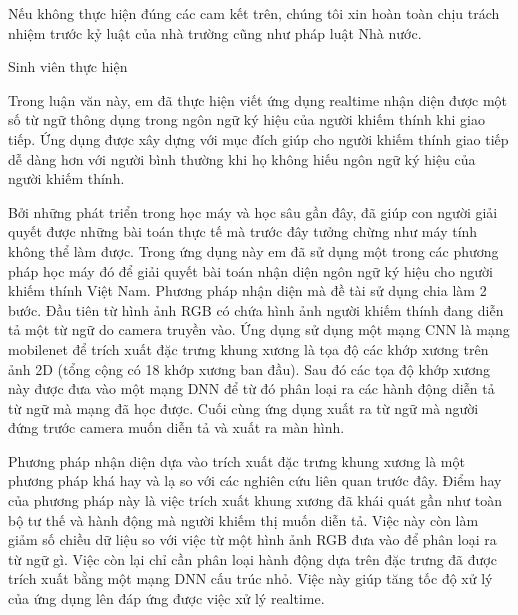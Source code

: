 Nếu không thực hiện đúng các cam kết trên, chúng tôi xin hoàn toàn chịu trách nhiệm trước kỷ luật của nhà trường cũng như pháp luật Nhà nước.

\begin{flushright}
Sinh viên thực hiện
\end{flushright}


\newpage
{}
\thispagestyle{tom_tat}
\begin{center}
{}
\end{center}

Trong luận văn này, em đã thực hiện viết ứng dụng realtime nhận diện được một số từ ngữ thông dụng trong ngôn ngữ ký hiệu của người khiếm thính khi giao tiếp. Ứng dụng được xây dựng với mục đích giúp cho người khiếm thính giao tiếp dễ dàng hơn với người bình thường khi họ không hiếu ngôn ngữ ký hiệu của người khiếm thính.

Bởi những phát triển trong học máy và học sâu gần đây, đã giúp con người giải quyết được những bài toán thực tế mà trước đây tưởng chừng như máy tính không thể làm được. Trong ứng dụng này em đã sử dụng một trong các phương pháp học máy đó để giải quyết bài toán nhận diện ngôn ngữ ký hiệu cho người khiếm thính Việt Nam. Phương pháp nhận diện mà đề tài sử dụng chia làm 2 bước. Đầu tiên từ hình ảnh RGB có chứa hình ảnh người khiếm thính đang diễn tả một từ ngữ do camera truyền vào. Ứng dụng sử dụng một mạng CNN là mạng mobilenet để trích xuất đặc trưng khung xương là tọa độ các khớp xương trên ảnh 2D (tổng cộng có 18 khớp xương ban đầu). Sau đó các tọa độ khớp xương này được đưa vào một mạng DNN để từ đó phân loại ra các hành động diễn tả từ ngữ mà mạng đã học được. Cuối cùng ứng dụng xuất ra từ ngữ mà người đứng trước camera muốn diễn tả và xuất ra màn hình.

Phương pháp nhận diện dựa vào trích xuất đặc trưng khung xương là một phương pháp khá hay và lạ so với các nghiên cứu liên quan trước đây. Điểm hay của phương pháp này là việc trích xuất khung xương đã khái quát gần như toàn bộ tư thế và hành động mà người khiếm thị muốn diễn tả. Việc này còn làm giảm số chiều dữ liệu so với việc từ một hình ảnh RGB đưa vào để phân loại ra từ ngữ gì. Việc còn lại chỉ cần phân loại hành động dựa trên đặc trưng đã được trích xuất bằng một mạng DNN cấu trúc nhỏ. Việc này giúp tăng tốc độ xử lý của ứng dụng lên đáp ứng được việc xử lý realtime.

